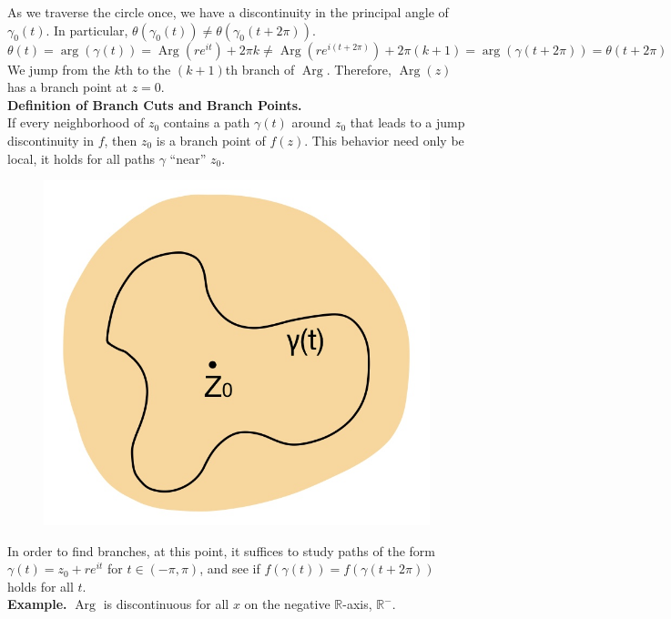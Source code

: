 \documentclass[11pt]{article}
\begin{document}
As we traverse the circle once, we have a discontinuity in the principal angle of $\gamma_0(t)$. In particular, $\theta(\gamma_0(t)) \neq \theta(\gamma_0(t + 2\pi))$.
$$\theta(t) = \operatorname{arg}\left(\gamma(t)\right) = \operatorname{Arg}\left(re^{it}\right) + 2\pi k \neq \operatorname{Arg}\left(re^{i(t + 2\pi)}\right) + 2\pi (k + 1) = \operatorname{arg}(\gamma(t + 2\pi)) = \theta(t + 2\pi)$$
We jump from the $k$th to the $(k+1)$th branch of $\operatorname{Arg}$. Therefore, $\operatorname{Arg}(z)$ has a branch point at $z = 0$. \\

\textbf{Definition of Branch Cuts and Branch Points.}\\
If every neighborhood of $z_0$ contains a path $\gamma(t)$ around $z_0$ that leads to a jump discontinuity in $f$, then $z_0$ is a branch point of $f(z)$. This behavior need only be local, it holds for all paths $\gamma$ ``near'' $z_0$. 
\begin{figure}[H]
\includegraphics[scale = 0.22]{5_3}
\centering
\end{figure}
In order to find branches, at this point, it suffices to study paths of the form $\gamma(t) = z_0 + re^{it}$ for $t \in (-\pi, \pi)$, and see if $f(\gamma(t)) = f(\gamma(t + 2\pi))$ holds for all $t$. \\
\newline
\textbf{Example.} $\operatorname{Arg}$ is discontinuous for all $x$ on the negative $\mathbb{R}$-axis, $\mathbb{R}^-$. \\
\end{document}
